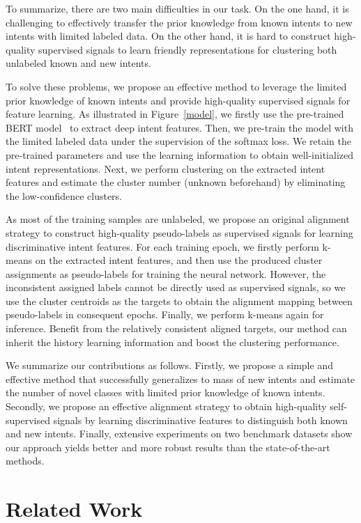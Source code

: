\documentclass[letterpaper]{article} \usepackage{aaai21}  \usepackage{times}  \usepackage{helvet} \usepackage{courier}  \usepackage[hyphens]{url}  \usepackage{graphicx} \urlstyle{rm} \def\UrlFont{\rm}  \usepackage{natbib}  \usepackage{caption} \frenchspacing  \setlength{\pdfpagewidth}{8.5in}  \setlength{\pdfpageheight}{11in}  \usepackage{amsmath}
\begin{document}
	To summarize, there are two main difficulties in our task. On the one hand, it is challenging to effectively transfer the prior knowledge from known intents to new intents with limited labeled data. On the other hand, it is hard to construct high-quality supervised signals to learn friendly representations for clustering both unlabeled known and new intents.
	
	To solve these problems, we propose an effective method to leverage the limited prior knowledge of known intents and provide high-quality supervised signals for feature learning.  As illustrated in Figure~\ref{model}, we firstly use the pre-trained BERT model~\cite{devlin2018bert} to extract deep intent features. Then, we pre-train the model with the limited labeled data under the supervision of the softmax loss. We retain the pre-trained parameters and use the learning information to obtain well-initialized intent representations. Next, we perform clustering on the extracted intent features and estimate the cluster number  (unknown beforehand) by eliminating the low-confidence clusters.
	
	As most of the training samples are unlabeled, we propose an original alignment strategy to construct high-quality pseudo-labels as supervised signals for learning discriminative intent features. For each training epoch, we firstly perform k-means on the extracted intent features, and then use the produced cluster assignments as pseudo-labels for training the neural network. However, the inconsistent assigned labels cannot be directly used as supervised signals, so we use the cluster centroids as the targets to obtain the alignment mapping between pseudo-labels in consequent epochs. Finally, we perform k-means again for inference. Benefit from the relatively consistent aligned targets, our method can inherit the history learning information and boost the clustering performance.
	
	We summarize our contributions as follows. Firstly, we propose a simple and effective method that successfully generalizes to mass of new intents and estimate the number of novel classes with limited prior knowledge of known intents. Secondly, we propose an effective alignment strategy to obtain high-quality self-supervised signals by learning discriminative features to distinguish both known and new intents. Finally, extensive experiments on two benchmark datasets show our approach yields better and more robust results than the state-of-the-art methods. 
	
	\section{Related Work}
\end{document}
